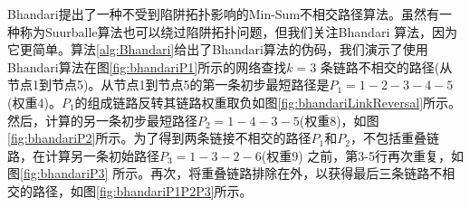 Bhandari\cite{bhandari1997optimal}提出了一种不受到陷阱拓扑影响的Min-Sum不相交路径算法。虽然有一种称为Suurballe算法\cite{suurballe1974disjoint}也可以绕过陷阱拓扑问题，但我们关注Bhandari 算法，因为它更简单。算法\ref{alg:Bhandari}给出了Bhandari算法的伪码，我们演示了使用Bhandari算法在图\ref{fig:bhandariP1}所示的网络查找$k=3$ 条链路不相交的路径(从节点1到节点5)。从节点1到节点5的第一条初步最短路径是$P_1=1-2-3-4-5$(权重4)。$P_1$的组成链路反转其链路权重取负如图\ref{fig:bhandariLinkReversal}所示。然后，计算的另一条初步最短路径$P_2=1-4-3-5$(权重8)，如图\ref{fig:bhandariP2}所示。为了得到两条链接不相交的路径$P_1$和$P_2$，不包括重叠链路，在计算另一条初始路径$P_3=1-3-2-6$(权重9) 之前，第3-5行再次重复，如图\ref{fig:bhandariP3} 所示。再次，将重叠链路排除在外，以获得最后三条链路不相交的路径，如图\ref{fig:bhandariP1P2P3}所示。

\begin{figure}[htbp]
  \centering

\end{figure}
